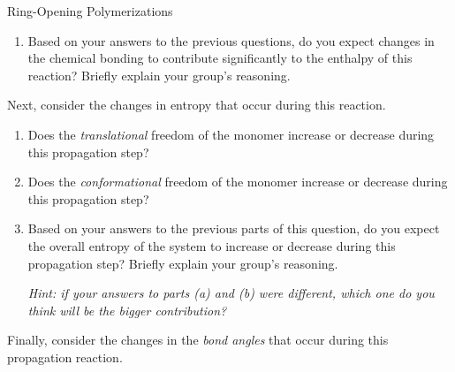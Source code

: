 \begin{activity}{Ring-Opening Polymerizations}
\begin{ctqs}
\begin{enumerate}
			\item Based on your answers to the previous questions, do you expect changes in the chemical bonding to contribute significantly to the enthalpy of this reaction? Briefly explain your group's reasoning.
			
				\begin{solution}[1.25in]
				\end{solution}
						
		\end{enumerate}
	
	\question Next, consider the changes in entropy that occur during this reaction.
	
		\begin{enumerate}
			
			\item Does the \textit{translational} freedom of the monomer increase or decrease during this propagation step?  %
			
				\begin{solution}[0.5in]
				\end{solution}
			
			\item Does the \textit{conformational} freedom of the monomer increase or decrease during this propagation step?  %
			
				\begin{solution}[0.5in]
				\end{solution}
			
			\item Based on your answers to the previous parts of this question, do you expect the overall entropy of the system to increase or decrease during this propagation step?  Briefly explain your group's reasoning.
			
				\emph{Hint: if your answers to parts (a) and (b) were different, which one do you think will be the bigger contribution?}
			
				\begin{solution}[1.5in]
				\end{solution}
			
		\end{enumerate}
		
	\question Finally, consider the changes in the \emph{bond angles} that occur during this propagation reaction.
	
		\begin{enumerate}
		

\end{enumerate}
\end{ctqs}
\end{activity}
